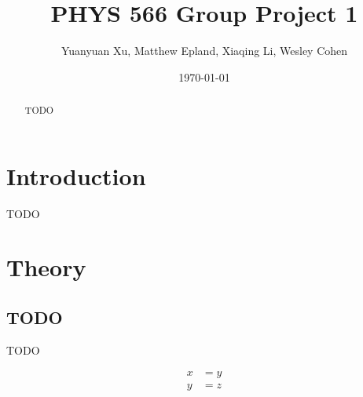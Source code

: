 \documentclass[notitlepage,aps,prd,nofootinbib]{revtex4-1}
\begin{document}
\title{PHYS 566 Group Project 1}
\author{Yuanyuan Xu, Matthew Epland, Xiaqing Li, Wesley Cohen}

\date{\today}

\begin{abstract}
TODO
\end{abstract}\maketitle

\section{Introduction}
\label{sec:intro}
TODO

\section{Theory}
\subsection{TODO}
\label{subsec:TODO}
TODO

\begin{align}
x &= y \label{eq:todo1} \\
y &= z \label{eq:todo2}
\end{align}
\label{sec:theory}
\end{document}
